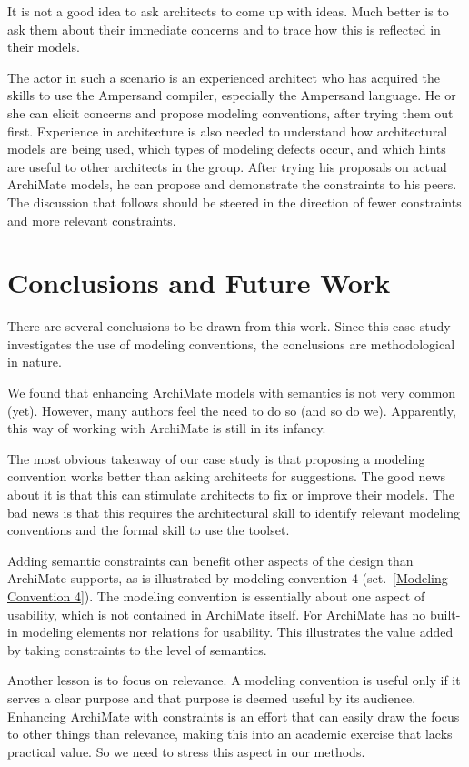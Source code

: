 \documentclass[sn-vancouver]{sn-jnl}%
\theoremstyle{thmstyleone}%
\theoremstyle{thmstyletwo}%
\theoremstyle{thmstylethree}%
\begin{document}
It is not a good idea to ask architects to come up with ideas.
Much better is to ask them about their immediate concerns and to trace how this is reflected in their models.

The actor in such a scenario is an experienced architect who has acquired the skills to use the Ampersand compiler, especially the Ampersand language.
He or she can elicit concerns and propose modeling conventions, after trying them out first.
Experience in architecture is also needed to understand how architectural models are being used,
which types of modeling defects occur,
and which hints are useful to other architects in the group.
After trying his proposals on actual ArchiMate models, he can propose and demonstrate the constraints to his peers.
The discussion that follows should be steered in the direction of fewer constraints and more relevant constraints.

\section{Conclusions and Future Work}\label{conclusion}
There are several conclusions to be drawn from this work.
Since this case study investigates the use of modeling conventions, the conclusions are methodological in nature.

We found that enhancing ArchiMate models with semantics is not very common (yet).
However, many authors feel the need to do so (and so do we).
Apparently, this way of working with ArchiMate is still in its infancy.

The most obvious takeaway of our case study is that proposing a modeling convention works better than asking architects for suggestions.
The good news about it is that this can stimulate architects to fix or improve their models.
The bad news is that this requires the architectural skill to identify relevant modeling conventions and the formal skill to use the toolset.

Adding semantic constraints can benefit other aspects of the design than ArchiMate supports,
as is illustrated by modeling convention 4 (sct.~\ref{Modeling Convention 4}).
The modeling convention is essentially about one aspect of usability, which is not contained in ArchiMate itself.
For ArchiMate has no built-in modeling elements nor relations for usability.
This illustrates the value added by taking constraints to the level of semantics.

Another lesson is to focus on relevance.
A modeling convention is useful only if it serves a clear purpose and that purpose is deemed useful by its audience.
Enhancing ArchiMate with constraints is an effort that can easily draw the focus to other things than relevance,
making this into an academic exercise that lacks practical value.
So we need to stress this aspect in our methods.
\end{document}
